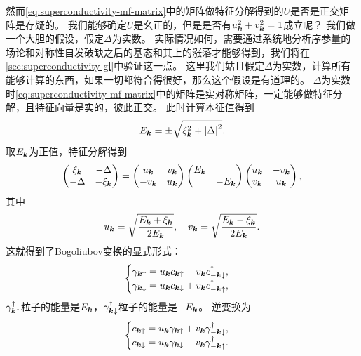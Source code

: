 然而\eqref{eq:superconductivity-mf-matrix}中的矩阵做特征分解得到的$U$是否是正交矩阵是存疑的。
我们能够确定$U$是幺正的，但是是否有$u_{\vb*{k}}^2 + v_{\vb*{k}}^2 = 1$成立呢？
我们做一个大胆的假设，假定$\Delta$为实数。
实际情况如何，需要通过系统地分析序参量的场论和对称性自发破缺之后的基态和其上的涨落才能够得到，我们将在\autoref{sec:superconductivity-gl}中验证这一点。
这里我们姑且假定$\Delta$为实数，计算所有能够计算的东西，如果一切都符合得很好，那么这个假设是有道理的。
$\Delta$为实数时\eqref{eq:superconductivity-mf-matrix}中的矩阵是实对称矩阵，一定能够做特征分解，且特征向量是实的，彼此正交。
此时计算本征值得到
\begin{equation}
    E_{\vb*{k}} = \pm \sqrt{ \xi_{\vb*{k}}^2 + \abs{\Delta}^2 }.
    \label{eq:s-wave-energy-band}
\end{equation}
取$E_{\vb*{k}}$为正值，特征分解得到
\[
    \pmqty{ \xi_{\vb*{k}} & - \Delta \\ - \Delta & - \xi_{\vb*{k}} } = \pmqty{u_{\vb*{k}} & v_{\vb*{k}} \\ - v_{\vb*{k}} & u_{\vb*{k}}} \pmqty{\dmat{E_{\vb*{k}}, - E_{\vb*{k}}}} \pmqty{u_{\vb*{k}} & -v_{\vb*{k}} \\ v_{\vb*{k}} & u_{\vb*{k}}},
\]
其中
\begin{equation}
    u_{\vb*{k}} = \sqrt{\frac{E_{\vb*{k}} + \xi_{\vb*{k}}}{2 E_{\vb*{k}}}}, \quad v_{\vb*{k}} = \sqrt{\frac{E_{\vb*{k}} - \xi_{\vb*{k}}}{2 E_{\vb*{k}}}}.
\end{equation}
这就得到了Bogoliubov变换的显式形式：
\begin{equation}
    \begin{cases}
        {\gamma}_{\vb*{k} \uparrow} = u_{\vb*{k}} {c}_{\vb*{k} \uparrow} - v_{\vb*{k}} {c}_{-\vb*{k} \downarrow}^\dagger, \\
        {\gamma}_{\vb*{k} \downarrow} = u_{\vb*{k}} {c}_{\vb*{k} \downarrow} + v_{\vb*{k}} {c}_{-\vb*{k} \uparrow}^\dagger,
    \end{cases}
    \label{eq:bogoliubov-transform}
\end{equation}
$\gamma_{\vb*{k} \uparrow}^\dagger$粒子的能量是$E_{\vb*{k}}$，$\gamma_{\vb*{k} \downarrow}^\dagger$粒子的能量是$- E_{\vb*{k}}$。
逆变换为
\begin{equation}
    \begin{cases}
        {c}_{\vb*{k} \uparrow} = u_{\vb*{k}} {\gamma}_{\vb*{k} \uparrow} + v_{\vb*{k}} {\gamma}_{-\vb*{k} \downarrow}^\dagger, \\
        {c}_{\vb*{k} \downarrow} = u_{\vb*{k}} {\gamma}_{\vb*{k} \downarrow} - v_{\vb*{k}} {\gamma}_{-\vb*{k} \uparrow}^\dagger.
    \end{cases}
    \label{eq:inverse-bogoliubov-transform}
\end{equation}

